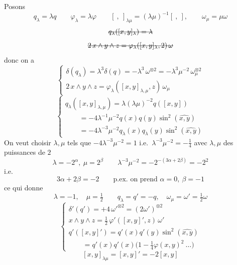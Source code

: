 \documentclass[11pt,a4paper]{article}
\begin{document}
 Posons
\[
q_\lambda=\lambda q\qquad \varphi_\lambda=\lambda\varphi\qquad [\ ,\ ]_{\lambda\mu}=(\lambda\mu)^{-1}[\ ,\ ],\qquad \omega_\mu=\mu\omega
\]
\[
\text{\struck{$q_\lambda([x,y]_\lambda)=\lambda$}}
\]
\[
\text{\struck{$2\,x\wedge y\wedge z=\varphi_\lambda([x,y]_\lambda,2)\,\omega$}}
\]
donc on a
\[
\begin{cases}
\delta(q_\lambda)=\lambda^3\delta(q)=-\lambda^3\,\omega^{\otimes 2}=-\lambda^3\mu^{-2}\,\omega_\mu^{\otimes 2}\\
2\,x\wedge y\wedge z=\varphi_\lambda([x,y]_{\lambda,\mu},z)\,\omega_\mu
\end{cases}
\]
\[
\begin{cases}
q_\lambda([x,y]_{\lambda,\mu})=\lambda(\lambda\mu)^{-2}q([x,y])\\
\qquad =-4\lambda^{-1}\mu^{-2}q(x)q(y)\sin^2(\widehat{x,y})\\
\qquad =-4\lambda^{-3}\mu^{-2}q_\lambda(x)q_\lambda(y)\sin^2(\widehat{x,y})
\end{cases}
\]
On veut choisir $\lambda,\mu$ tels que $-4\lambda^{-3}\mu^{-2}=1$
i.e.\ $\lambda^{-3}\mu^{-2}=-\frac14$ avec $\lambda,\mu$ des  puissances de $2$
\[
\lambda=-2^{\alpha},\ \mu=2^{\beta}\qquad \lambda^{-3}\mu^{-2}=-2^{-(3\alpha+2\beta)}=-2^{2}
\]
i.e.\ \ill{} \ill{}
\[
3\alpha+2\beta=-2\qquad \text{p.ex.\ on prend } \alpha=0,\ \beta=-1
\]
ce qui donne
\[
\lambda=-1,\quad \mu=\tfrac12\qquad q_\lambda=q'=-q,\quad \omega_\mu=\omega'=\tfrac12\omega
\]
\[
\begin{cases}
\delta'(q')=+4\,\omega'^{\otimes 2}=(2\omega')^{\otimes 2}\\
x\wedge y\wedge z=\frac12\,\varphi'([x,y]',z)\,\omega'\\
q'([x,y]')=q'(x)q'(y)\sin^2(\widehat{x,y})\\
\qquad =q'(x)q'(x)\bigl(1-\tfrac14\varphi(x,y)^2\ \dots\bigr)
\end{cases}
\]
\[
[x,y]_{\lambda\mu}=[x,y]'=-2[x,y]
\]
\end{document}
